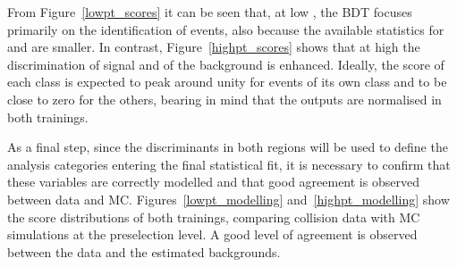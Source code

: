 From Figure~\ref{lowpt_scores} it can be seen that, at low \pth, the BDT focuses primarily on the identification of \ttbar events, also because the available statistics for \ttHtt and \ztautau are smaller. In contrast, Figure~\ref{highpt_scores} shows that at high \pth the discrimination of signal and of the \ztautau background is enhanced. Ideally, the score of each class is expected to peak around unity for events of its own class and to be close to zero for the others, bearing in mind that the outputs are normalised in both trainings.

As a final step, since the discriminants in both \pth regions will be used to define the analysis categories entering the final statistical fit, it is necessary to confirm that these variables are correctly modelled and that good agreement is observed between data and MC. Figures~\ref{lowpt_modelling} and~\ref{highpt_modelling} show the score distributions of both trainings, comparing collision data with MC simulations at the \ttH preselection level. A good level of agreement is observed between the data and the estimated backgrounds.

